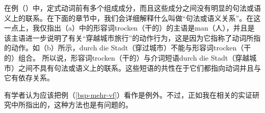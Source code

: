 \noindent
在例（）中，定式动词前有多个组成成分，而且这些成分之间没有明显的句法或语义上的联系。在下面的章节中，我们会详细解释什么叫做“句法或语义关系”。在这一点上，我仅指出（a）中的形容词trocken（干的）的主语是man（人），并且是该主语进一步说明了有关“穿越城市旅行”的动作行为，这是因为它指称了动词所指的动作。如（b）所示，durch die Stadt（穿过城市）不能与形容词trocken（干的）组合。
\addlines
\eal
{}
\zl
所以说，形容词trocken（干的）与介词短语durch die Stadt（穿越城市）之间不具有句法或语义上的联系。这些短语的共性在于它们都指向动词并且与它有依存关系。

有学者认为应该把例（\ref{bsp-mehr-vf}）看作是例外。不过，正如我在相关的实证研究中所指出的，这种方法也是有问题的\citep{Mueller2003b}。

